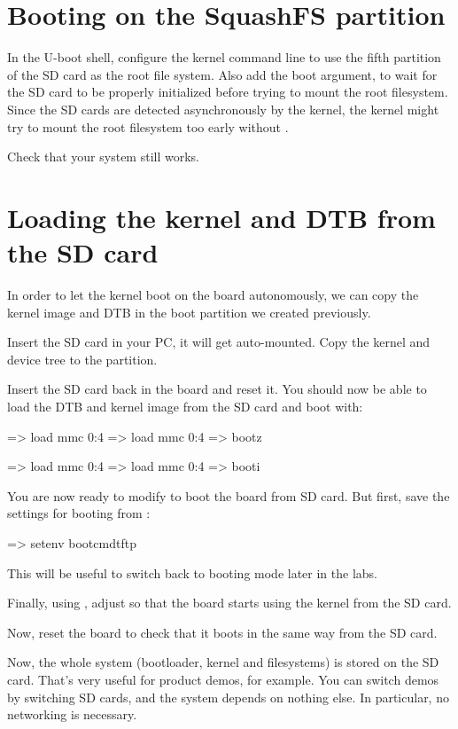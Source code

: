 \section{Booting on the SquashFS partition}

In the U-boot shell, configure the kernel command line to use the
fifth partition of the SD card as the root file system. Also add the
 boot argument, to wait for the SD card to be properly
initialized before trying to mount the root filesystem. Since the SD
cards are detected asynchronously by the kernel, the kernel might try
to mount the root filesystem too early without .

Check that your system still works.

\section{Loading the kernel and DTB from the SD card}

In order to let the kernel boot on the board autonomously, we can
copy the kernel image and DTB in the boot partition we created
previously.

Insert the SD card in your PC, it will get auto-mounted. Copy the
kernel and device tree to the  partition.

Insert the SD card back in the board and reset it. You should now be
able to load the DTB and kernel image from the SD card and boot with:
\if{}
\begin{ubootinput}
=> load mmc 0:4 %
=> load mmc 0:4 %
=> bootz %
\end{ubootinput}
\fi
\if{}
\begin{ubootinput}
=> load mmc 0:4 %
=> load mmc 0:4 %
=> booti %
\end{ubootinput}
\fi

You are now ready to modify  to boot the board
from SD card. But first, save the settings for booting from
:

\begin{ubootinput}
=> setenv bootcmdtftp %
\end{ubootinput}

This will be useful to switch back to  booting mode
later in the labs.

Finally, using , adjust  so that
the board starts using the kernel from the SD card.

Now, reset the board to check that it boots in the same way from the
SD card.

Now, the whole system (bootloader, kernel and filesystems) is
stored on the SD card. That's very useful for product demos, for
example. You can switch demos by switching SD cards, and the
system depends on nothing else. In particular, no networking is
necessary.
